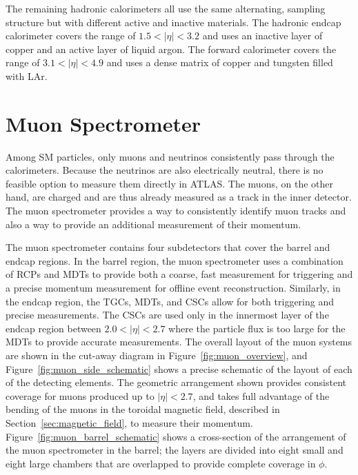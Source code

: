 The remaining hadronic calorimeters all use the same alternating, sampling structure but with different active and inactive materials.
The hadronic endcap calorimeter covers the range of $1.5 < |\eta| < 3.2$ and uses an inactive layer of copper and an active layer of \acl{liquid argon}.
The forward calorimeter covers the range of $3.1 < |\eta| < 4.9$ and uses a dense matrix of copper and tungsten filled with \acl{LAr}. 


\section{Muon Spectrometer}

Among \ac{SM} particles, only muons and neutrinos consistently pass through the calorimeters.
Because the neutrinos are also electrically neutral, there is no feasible option to measure them directly in \ac{ATLAS}.
The muons, on the other hand, are charged and are thus already measured as a track in the inner detector.
The muon spectrometer provides a way to consistently identify muon tracks and also a way to provide an additional measurement of their momentum.

The muon spectrometer contains four subdetectors that cover the barrel and endcap regions.
In the barrel region, the muon spectrometer uses a combination of \acp{RCP} and \acp{MDT} to provide both a coarse, fast measurement for triggering and a precise momentum measurement for offline event reconstruction.
Similarly, in the endcap region, the \acp{TGC}, \acp{MDT}, and \acp{CSC} allow for both triggering and precise measurements.
The \acp{CSC} are used only in the innermost layer of the endcap region between $2.0 < |\eta| < 2.7$ where the particle flux is too large for the \acp{MDT} to provide accurate measurements.
The overall layout of the muon systems are shown in the cut-away diagram in Figure~\ref{fig:muon_overview}, and Figure~\ref{fig:muon_side_schematic} shows a precise schematic of the layout of each of the detecting elements.
The geometric arrangement shown provides consistent coverage for muons produced up to $|\eta| < 2.7$, and takes full advantage of the bending of the muons in the toroidal magnetic field, described in Section~\ref{sec:magnetic_field}, to measure their momentum.
Figure~\ref{fig:muon_barrel_schematic} shows a cross-section of the arrangement of the muon spectrometer in the barrel; the layers are divided into eight small and eight large chambers that are overlapped to provide complete coverage in $\phi$. 



